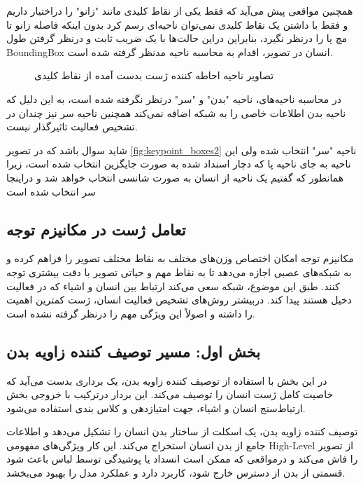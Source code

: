 همچنین مواقعی پیش می‌آید که فقط یکی از نقاط کلیدی مانند "زانو" را دراختیار داریم و فقط با داشتن یک نقاط کلیدی نمی‌توان ناحیه‌ای رسم کرد بدون اینکه فاصله زانو تا مچ پا را درنظر نگیرد، بنابراین دراین حالت‌ها با یک ضریب ثابت و درنظر گرفتن طول %
\gls{BoundingBox}
 انسان در تصویر، اقدام به محاسبه ناحیه مدنظر گرفته شده است.
  \begin{figure}
	\centering
	\hfill
	\hfill
	\caption{تصاویر ناحیه احاطه کننده ژست بدست آمده از نقاط کلیدی}
	\label{fig:keypoint_boxes}
\end{figure}

در محاسبه ناحیه‌های، ناحیه "بدن" و "سر" درنظر نگرفته شده است، به این دلیل که ناحیه بدن اطلاعات خاصی را به شبکه اضافه نمی‌کند همچنین ناحیه سر نیز چندان در تشخیص فعالیت تاثیرگذار نیست.

شاید سوال باشد که در تصویر %
\ref{fig:keypoint_boxes2}
 ناحیه "سر" انتخاب شده ولی این ناحیه به جای ناحیه پا که دچار اسنداد شده به صورت جایگزین انتخاب شده است، زیرا همانطور که گفتیم یک ناحیه از انسان به صورت شانسی انتخاب خواهد شد و دراینجا سر انتخاب شده است
 \subsection{تعامل ژست در مکانیزم توجه}
مکانیزم توجه امکان اختصاص وزن‌های مختلف به نقاط مختلف تصویر را فراهم کرده و به شبکه‌های عصبی اجازه می‌دهد تا به نقاط مهم و حیاتی تصویر با دقت بیشتری توجه کنند. طبق این موضوع، شبکه سعی می‌‌کند ارتباط بین انسان و اشیاء که در فعالیت دخیل هستند پیدا کند. دربیشتر روش‌های تشخیص فعالیت انسان، ژست کمترین اهمیت را داشته و اصولاً این ویژگی مهم را درنظر گرفته نشده است. 
 \subsection{بخش اول: مسیر توصیف کننده زاویه بدن }
 در این بخش با استفاده از توصیف کننده زاویه بدن،‌ یک برداری بدست می‌آید که خاصیت کامل ژست انسان را توصیف می‌کند. این بردار درترکیب با خروجی بخش ارتباط‌سنج انسان و اشیاء، جهت امتیاز‌دهی و کلاس بندی استفاده می‌شود.
 
 توصیف کننده زاویه بدن، یک اسکلت از ساختار بدن انسان را تشکیل می‌دهد و اطلاعات جامع از بدن انسان استخراج می‌کند. این کار ویژگی‌های مفهومی %
\gls{High-Level}
  از تصویر را فاش ‌می‌کند و درمواقعی که ممکن است انسداد یا پوشیدگی توسط لباس باعث شود قسمتی از بدن از دسترس خارج شود، کاربرد دارد و عملکرد مدل را بهبود می‌بخشد. 
  
